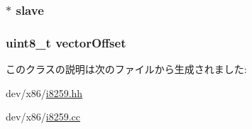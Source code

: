 \label{classX86ISA_1_1I8259_a6e286ff90731d05a67b6e48701b35cb8}
\hypertarget{classX86ISA_1_1I8259_a8c6f2e957037d32e002591662762b0b9}{
\subsubsection[{slave}]{$\ast$ {\bf slave}}}
\label{classX86ISA_1_1I8259_a8c6f2e957037d32e002591662762b0b9}
\hypertarget{classX86ISA_1_1I8259_a0dab9c49a4355dabc77b494a0f2ee7af}{
\subsubsection[{vectorOffset}]{\setlength{\rightskip}{0pt plus 5cm}uint8\_\-t {\bf vectorOffset}}}
\label{classX86ISA_1_1I8259_a0dab9c49a4355dabc77b494a0f2ee7af}


このクラスの説明は次のファイルから生成されました:\begin{DoxyCompactItemize}
\item 
dev/x86/\hyperlink{i8259_8hh}{i8259.hh}\item 
dev/x86/\hyperlink{i8259_8cc}{i8259.cc}\end{DoxyCompactItemize}
